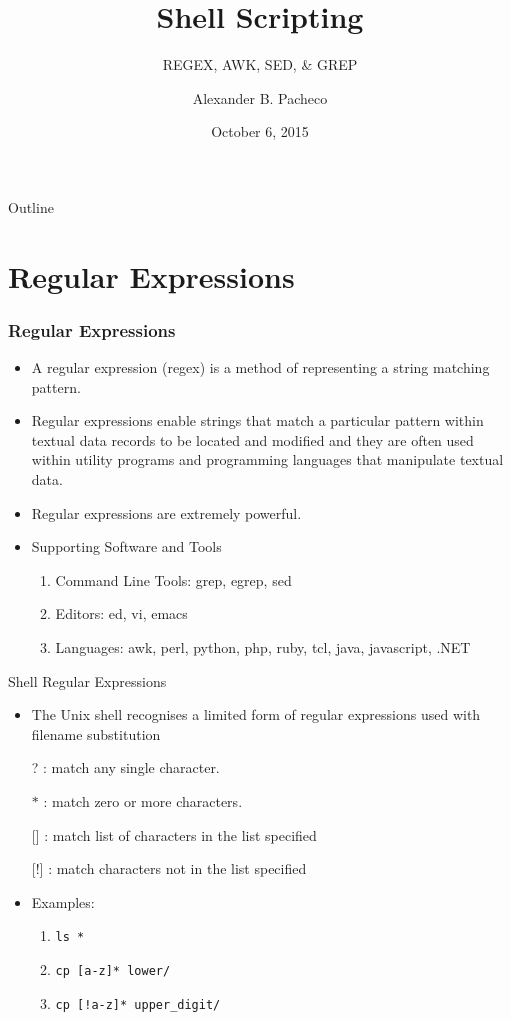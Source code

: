 \documentclass[10pt,t]{beamer}
\title{Shell Scripting}
\subtitle{REGEX, AWK, SED, \& GREP}
\author{Alexander B. Pacheco}
\institute{\href{http://researchcomputing.lehigh.edu}{LTS Research Computing}}%
\date{October 6, 2015}%
\begin{document}
\begin{frame}
  \titlepage
\end{frame}

\footnotesize
\begin{frame}{Outline}
  \tableofcontents
\end{frame}

\section{Regular Expressions}
\begin{frame}[c]
  \frametitle{Regular Expressions}
  \begin{itemize}
    \item A regular expression (regex) is a method of representing a string matching pattern. 
    \item Regular expressions enable strings that match a particular pattern within textual data records to be located and modified and they are often used within utility programs and programming languages that manipulate textual data. 
    \item Regular expressions are extremely powerful.
    \item Supporting Software and Tools
    \begin{enumerate}
        \item Command Line Tools: grep, egrep, sed
        \item Editors: ed, vi, emacs
        \item Languages: awk, perl, python, php, ruby, tcl, java, javascript, .NET
    \end{enumerate}
  \end{itemize}
\end{frame}

\begin{frame}[c]{Shell Regular Expressions}
  \begin{itemize}
    \item The Unix shell recognises a limited form of regular expressions used with filename substitution
    \item[?]: match any single character.
    \item[$\ast$]: match zero or more characters.
    \item[{[\quad]}]: match list of characters in the list specified
    \item[{[!\quad]}]: match characters not in the list specified
    \item Examples:
    \begin{enumerate}
      \item \texttt{ls *}
      \item \texttt{cp [a-z]* lower/}
      \item \texttt{cp [!a-z]* upper\_digit/}
    \end{enumerate}
  \end{itemize}
\end{frame}
\end{document}
